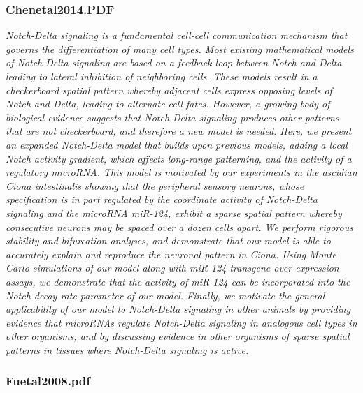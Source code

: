 \documentclass[graybox]{svmult}
\begin{document}
\subsubsection{Chenetal2014.PDF}
\cite{Chen2014}
\textit{Notch-Delta signaling is a fundamental cell-cell communication mechanism that governs the differentiation of many cell types. Most existing mathematical models of Notch-Delta signaling are based on a feedback loop between Notch and Delta leading to lateral inhibition of neighboring cells. These models result in a checkerboard spatial pattern whereby adjacent cells express opposing levels of Notch and Delta, leading to alternate cell fates. However, a growing body of biological evidence suggests that Notch-Delta signaling produces other patterns that are not checkerboard, and therefore a new model is needed. Here, we present an expanded Notch-Delta model that builds upon previous models, adding a local Notch activity gradient, which affects long-range patterning, and the activity of a regulatory microRNA. This model is motivated by our experiments in the ascidian Ciona intestinalis showing that the peripheral sensory neurons, whose specification is in part regulated by the coordinate activity of Notch-Delta signaling and the microRNA miR-124, exhibit a sparse spatial pattern whereby consecutive neurons may be spaced over a dozen cells apart. We perform rigorous stability and bifurcation analyses, and demonstrate that our model is able to accurately explain and reproduce the neuronal pattern in Ciona. Using Monte Carlo simulations of our model along with miR-124 transgene over-expression assays, we demonstrate that the activity of miR-124 can be incorporated into the Notch decay rate parameter of our model. Finally, we motivate the general applicability of our model to Notch-Delta signaling in other animals by providing evidence that microRNAs regulate Notch-Delta signaling in analogous cell types in other organisms, and by discussing evidence in other organisms of sparse spatial patterns in tissues where Notch-Delta signaling is active.}

\subsubsection{Fuetal2008.pdf}
\end{document}
